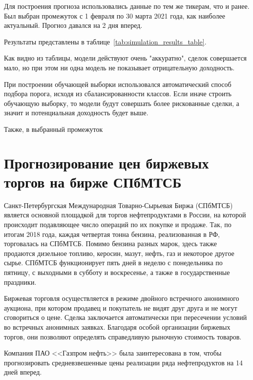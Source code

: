 \documentclass[a4paper,article,14pt]{extarticle}
\begin{document}
Для построения прогноза использовались данные по тем же тикерам, что и ранее.
Был выбран промежуток с 1 февраля по 30 марта 2021 года, как наиболее актуальный.
Прогноз давался на 2 дня вперед.

Результаты представлены в таблице~\ref{tab:simulation_results_table}.

Как видно из таблицы, модели действуют очень "аккуратно", сделок совершается мало, но при этом ни одна модель не показывает отрицательную доходность.

При построении обучающей выборки использовался автоматический способ подбора порога, исходя из сбалансированности классов.
Если иначе строить обучающую выборку, то модели будут совершать более рискованные сделки, а значит и потенциальная доходность будет выше.

Также, в выбранный промежуток



\pagebreak

\section{Прогнозирование цен биржевых торгов на бирже СПбМТСБ}

Санкт-Петербургская Международная Товарно-Сырьевая Биржа \linebreak
(СПбМТСБ)~\cite{spimex} является основной площадкой для торгов нефтепродуктами в России, на которой происходит подавляющее число операций по их покупке и продаже.
Так, по итогам 2018 года, каждая четвертая тонна бензина, реализованная в РФ, торговалась на СПбМТСБ.
Помимо бензина разных марок, здесь также продаются дизельное топливо, керосин, мазут, нефть, газ и некоторое другое сырье.
СПбМТСБ функционирует пять дней в неделю с понедельника по пятницу, с выходными в субботу и воскресенье, а также в государственные праздники.

Биржевая торговля осуществляется в режиме двойного встречного анонимного аукциона, при котором продавец и покупатель не видят друг друга и не могут сговориться о цене.
Сделка заключается автоматически при пересечении условий во встречных анонимных заявках.
Благодаря особой организации биржевых торгов, они позволяют определять справедливую рыночную стоимость товаров.

Компания ПАО <<Газпром нефть>> была заинтересована в том, чтобы прогнозировать средневзвешенные цены реализации ряда нефтепродуктов на 14 дней вперед.
\end{document}

